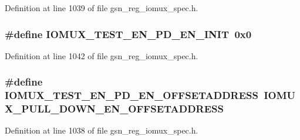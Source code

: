 Definition at line 1039 of file gsn\_\-reg\_\-iomux\_\-spec.h.

\hypertarget{a00560_a7103f3c7c5ccaa37676a8fc909a93cd2}{
\subsubsection[{IOMUX\_\-TEST\_\-EN\_\-PD\_\-EN\_\-INIT}]{\setlength{\rightskip}{0pt plus 5cm}\#define IOMUX\_\-TEST\_\-EN\_\-PD\_\-EN\_\-INIT~0x0}}
\label{a00560_a7103f3c7c5ccaa37676a8fc909a93cd2}


Definition at line 1042 of file gsn\_\-reg\_\-iomux\_\-spec.h.

\hypertarget{a00560_ae96ea975de9127e592034663213eb00d}{
\subsubsection[{IOMUX\_\-TEST\_\-EN\_\-PD\_\-EN\_\-OFFSETADDRESS}]{\setlength{\rightskip}{0pt plus 5cm}\#define IOMUX\_\-TEST\_\-EN\_\-PD\_\-EN\_\-OFFSETADDRESS~IOMUX\_\-PULL\_\-DOWN\_\-EN\_\-OFFSETADDRESS}}
\label{a00560_ae96ea975de9127e592034663213eb00d}


Definition at line 1038 of file gsn\_\-reg\_\-iomux\_\-spec.h.

